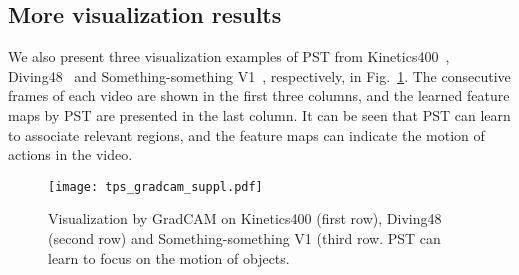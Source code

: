 \documentclass[runningheads]{llncs}
\begin{document}
	\subsection{More visualization results}
	We also present three visualization examples of PST from Kinetics400~\cite{kay2017kinetics}, Diving48~\cite{li2018resound} and Something-something V1~\cite{goyal2017something}, respectively, in Fig.~\ref{fig:tps_gradcam}. The consecutive frames of each video are shown in the first three columns, and the learned feature maps by PST are presented in the last column. It can be seen that PST can learn to associate relevant regions, and the feature maps can indicate the motion of actions in the video.
	
	\begin{figure}[h]
		
		\begin{center}
			\texttt{[image: tps\_gradcam\_suppl.pdf]}
		\end{center}
		\caption{Visualization by GradCAM on Kinetics400 (first row), Diving48 (second row) and Something-something V1 (third row. PST can learn to focus on the motion of objects. }\label{fig:tps_gradcam}
	\end{figure}
	
	
	
	

	
\end{document}
